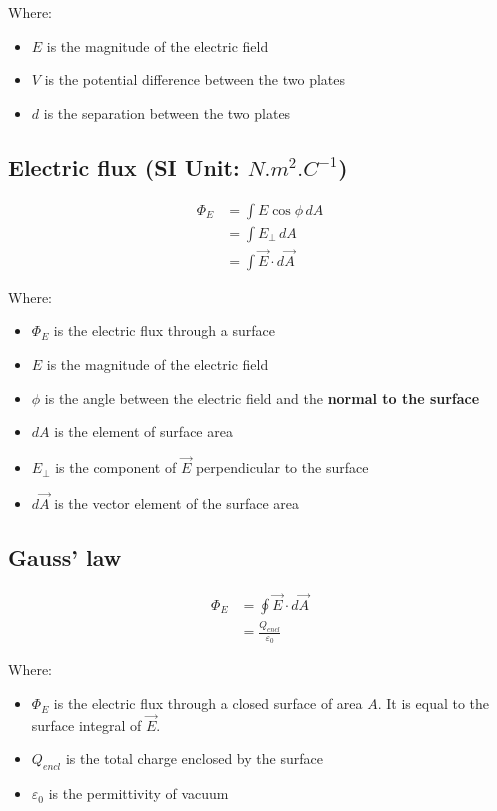 \documentclass[11pt]{article}
\begin{document}
Where:
\begin{itemize}
\item \(E\) is the magnitude of the electric field
\item \(V\) is the potential difference between the two plates
\item \(d\) is the separation between the two plates
\end{itemize}

\newpage

\subsection{Electric flux (SI Unit: \(\unit{N.m^2.C^{-1}}\))}
\label{sec:org937d34a}
\begin{align*}
\Phi_E &= \int E \cos \phi \, dA \\
&= \int E_{\perp} \, dA \\
&= \int \vec{E} \cdot d \vec{A}
\end{align*}

Where:
\begin{itemize}
\item \(\Phi_E\) is the electric flux through a surface
\item \(E\) is the magnitude of the electric field
\item \(\phi\) is the angle between the electric field and the \textbf{normal to the surface}
\item \(dA\) is the element of surface area
\item \(E_{\perp}\) is the component of \(\vec{E}\) perpendicular to the surface
\item \(d \vec{A}\) is the vector element of the surface area
\end{itemize}

\subsection{Gauss' law}
\label{sec:org74474cb}
\begin{align*}
\Phi_E &= \oint \vec{E} \cdot d \vec{A} \\
&= \frac{Q_{encl}}{\varepsilon_0}
\end{align*}

Where:
\begin{itemize}
\item \(\Phi_E\) is the electric flux through a closed surface of area \(A\). It is equal to the surface integral of \(\vec{E}\).
\item \(Q_{encl}\) is the total charge enclosed by the surface
\item \(\varepsilon_0\) is the permittivity of vacuum
\end{itemize}
\end{document}
